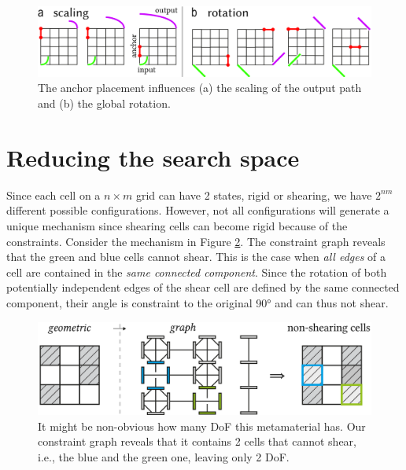 \begin{figure} [h]
    \includegraphics[width=\textwidth]{chapters/understanding-metamaterial-mechanisms-FIG/9-anchor-effects.png}
    \caption[Short figure name.]{The anchor placement influences (a) the scaling of the output path and (b) the global rotation. 
    \label{fig:9-anchor-effects}}
\end{figure}


\section{Reducing the search space}
\label{section:search-space}

Since each cell on a $n\times m$ grid can have 2 states, rigid or shearing, we have $2^{nm}$ different possible configurations. However, not all configurations will generate a unique mechanism since shearing cells can become rigid because of the constraints. Consider the mechanism in Figure \ref{fig:10-non-shearing-constraint-graph}. The constraint graph reveals that the green and blue cells cannot shear. This is the case when \textit{all edges} of a cell are contained in the \textit{same connected component}. Since the rotation of both potentially independent edges of the shear cell are defined by the same connected component, their angle is constraint to the original 90° and can thus not shear.

\begin{figure} [h]
    \includegraphics[width=\textwidth]{chapters/understanding-metamaterial-mechanisms-FIG/10-non-shearing-constraint-graph.png}
    \caption[Short figure name.]{It might be non-obvious how many DoF this metamaterial has. Our constraint graph reveals that it contains 2 cells that cannot shear, i.e., the blue and the green one, leaving only 2 DoF.
    \label{fig:10-non-shearing-constraint-graph}}
\end{figure}

